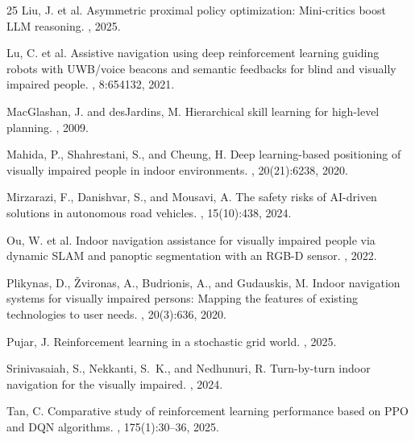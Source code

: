 \documentclass{article}
\begin{document}
\begin{thebibliography}{25}
Liu, J. et al.
\newblock Asymmetric proximal policy optimization: Mini-critics boost LLM reasoning.
, 2025.

Lu, C. et al.
\newblock Assistive navigation using deep reinforcement learning guiding robots with
UWB/voice beacons and semantic feedbacks for blind and visually impaired people.
, 8:654132, 2021.

MacGlashan, J. and desJardins, M.
\newblock Hierarchical skill learning for high-level planning.
, 2009.

Mahida, P., Shahrestani, S., and Cheung, H.
\newblock Deep learning-based positioning of visually impaired people in indoor
environments.
, 20(21):6238, 2020.

Mirzarazi, F., Danishvar, S., and Mousavi, A.
\newblock The safety risks of AI-driven solutions in autonomous road vehicles.
, 15(10):438, 2024.

Ou, W. et al.
\newblock Indoor navigation assistance for visually impaired people via dynamic SLAM
and panoptic segmentation with an RGB-D sensor.
, 2022.

Plikynas, D., {\v{Z}}vironas, A., Budrionis, A., and Gudauskis, M.
\newblock Indoor navigation systems for visually impaired persons: Mapping the
features of existing technologies to user needs.
, 20(3):636, 2020.

Pujar, J.
\newblock Reinforcement learning in a stochastic grid world.
, 2025.

Srinivasaiah, S., Nekkanti, S.~K., and Nedhunuri, R.
\newblock Turn-by-turn indoor navigation for the visually impaired.
, 2024.

Tan, C.
\newblock Comparative study of reinforcement learning performance based on PPO and
DQN algorithms.
, 175(1):30--36, 2025.


\end{thebibliography}
\end{document}
